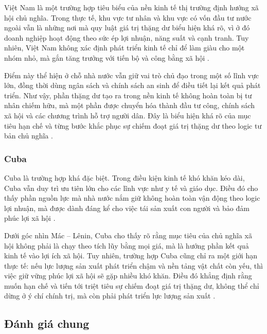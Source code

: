 Việt Nam là một trường hợp tiêu biểu của nền kinh tế thị trường định hướng xã hội chủ nghĩa. Trong thực tế, khu vực tư nhân và khu vực có vốn đầu tư nước ngoài vẫn là những nơi mà quy luật giá trị thặng dư biểu hiện khá rõ, vì ở đó doanh nghiệp hoạt động theo sức ép lợi nhuận, năng suất và cạnh tranh. Tuy nhiên, Việt Nam không xác định phát triển kinh tế chỉ để làm giàu cho một nhóm nhỏ, mà gắn tăng trưởng với tiến bộ và công bằng xã hội \cite{baochinhphu_gdp_2024,mpi_fdi_2024,hienphap2013}.

Điểm này thể hiện ở chỗ nhà nước vẫn giữ vai trò chủ đạo trong một số lĩnh vực lớn, đồng thời dùng ngân sách và chính sách an sinh để điều tiết lại kết quả phát triển. Như vậy, phần thặng dư tạo ra trong nền kinh tế không hoàn toàn bị tư nhân chiếm hữu, mà một phần được chuyển hóa thành đầu tư công, chính sách xã hội và các chương trình hỗ trợ người dân. Đây là biểu hiện khá rõ của mục tiêu hạn chế và từng bước khắc phục sự chiếm đoạt giá trị thặng dư theo logic tư bản chủ nghĩa \cite{baochinhphu_pvn_2025,baochinhphu_ansinh_2025,gt}.

\subsubsection{Cuba}

Cuba là trường hợp khá đặc biệt. Trong điều kiện kinh tế khó khăn kéo dài, Cuba vẫn duy trì ưu tiên lớn cho các lĩnh vực như y tế và giáo dục. Điều đó cho thấy phần nguồn lực mà nhà nước nắm giữ không hoàn toàn vận động theo logic lợi nhuận, mà được dành đáng kể cho việc tái sản xuất con người và bảo đảm phúc lợi xã hội \cite{baotintuc_cuba_2025,prensalatina_cuba}.

Dưới góc nhìn Mác -- Lênin, Cuba cho thấy rõ rằng mục tiêu của chủ nghĩa xã hội không phải là chạy theo tích lũy bằng mọi giá, mà là hướng phần kết quả kinh tế vào lợi ích xã hội. Tuy nhiên, trường hợp Cuba cũng chỉ ra một giới hạn thực tế: nếu lực lượng sản xuất phát triển chậm và nền tảng vật chất còn yếu, thì việc giữ vững phúc lợi xã hội sẽ gặp nhiều khó khăn. Điều đó khẳng định rằng muốn hạn chế và tiến tới triệt tiêu sự chiếm đoạt giá trị thặng dư, không thể chỉ dừng ở ý chí chính trị, mà còn phải phát triển lực lượng sản xuất \cite{gt,baotintuc_cuba_2025,prensalatina_cuba}.

\subsection{Đánh giá chung}

